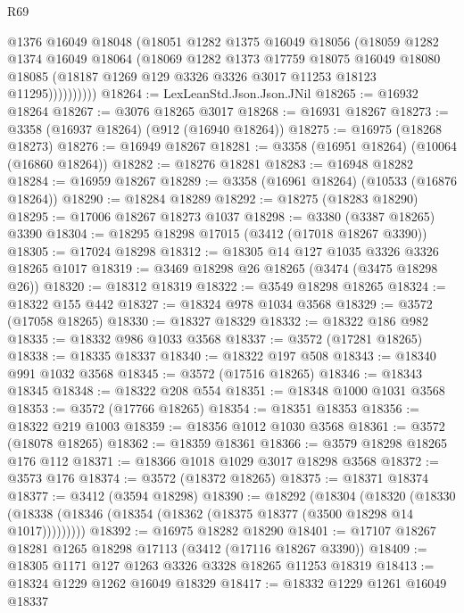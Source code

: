 \begin{lexlean}{R69}
\begin{coremodule}
                @1376
                @16049
                @18048
                (@18051
                  @1282
                  @1375
                  @16049
                  @18056
                  (@18059
                    @1282
                    @1374
                    @16049
                    @18064
                    (@18069
                      @1282
                      @1373
                      @17759
                      @18075
                      @16049
                      @18080
                      @18085
                      (@18187 @1269 @129 @3326 @3326 @3017 @11253 @18123 @11295))))))))))
@18264 := LexLeanStd.Json.Json.JNil
@18265 := @16932 @18264
@18267 := @3076 @18265 @3017
@18268 := @16931 @18267
@18273 := @3358 (@16937 @18264) (@912 (@16940 @18264))
@18275 := @16975 (@18268 @18273)
@18276 := @16949 @18267
@18281 := @3358 (@16951 @18264) (@10064 (@16860 @18264))
@18282 := @18276 @18281
@18283 := @16948 @18282
@18284 := @16959 @18267
@18289 := @3358 (@16961 @18264) (@10533 (@16876 @18264))
@18290 := @18284 @18289
@18292 := @18275 (@18283 @18290)
@18295 := @17006 @18267 @18273 @1037
@18298 := @3380 (@3387 @18265) @3390
@18304 := @18295 @18298 @17015 (@3412 (@17018 @18267 @3390))
@18305 := @17024 @18298
@18312 := @18305 @14 @127 @1035 @3326 @3326 @18265 @1017
@18319 := @3469 @18298 @26 @18265 (@3474 (@3475 @18298 @26))
@18320 := @18312 @18319
@18322 := @3549 @18298 @18265
@18324 := @18322 @155 @442
@18327 := @18324 @978 @1034 @3568
@18329 := @3572 (@17058 @18265)
@18330 := @18327 @18329
@18332 := @18322 @186 @982
@18335 := @18332 @986 @1033 @3568
@18337 := @3572 (@17281 @18265)
@18338 := @18335 @18337
@18340 := @18322 @197 @508
@18343 := @18340 @991 @1032 @3568
@18345 := @3572 (@17516 @18265)
@18346 := @18343 @18345
@18348 := @18322 @208 @554
@18351 := @18348 @1000 @1031 @3568
@18353 := @3572 (@17766 @18265)
@18354 := @18351 @18353
@18356 := @18322 @219 @1003
@18359 := @18356 @1012 @1030 @3568
@18361 := @3572 (@18078 @18265)
@18362 := @18359 @18361
@18366 := @3579 @18298 @18265 @176 @112
@18371 := @18366 @1018 @1029 @3017 @18298 @3568
@18372 := @3573 @176
@18374 := @3572 (@18372 @18265)
@18375 := @18371 @18374
@18377 := @3412 (@3594 @18298)
@18390 := @18292
    (@18304
      (@18320
        (@18330 (@18338 (@18346 (@18354 (@18362 (@18375 @18377 (@3500 @18298 @14 @1017)))))))))
@18392 := @16975 @18282 @18290
@18401 := @17107 @18267 @18281 @1265 @18298 @17113 (@3412 (@17116 @18267 @3390))
@18409 := @18305 @1171 @127 @1263 @3326 @3328 @18265 @11253 @18319
@18413 := @18324 @1229 @1262 @16049 @18329
@18417 := @18332 @1229 @1261 @16049 @18337

\end{coremodule}
\end{lexlean}

